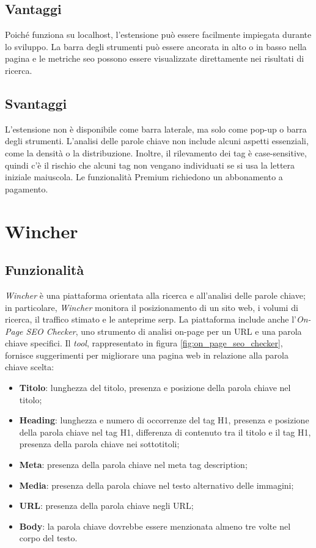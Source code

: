 \subsection{Vantaggi}
\par Poiché funziona su \gls{localhost}, l'estensione può essere facilmente impiegata durante lo sviluppo. La barra degli strumenti può essere ancorata in alto o in basso nella pagina e le metriche \gls{seo} possono essere visualizzate direttamente nei risultati di ricerca.

\subsection{Svantaggi}
\par L'estensione non è disponibile come barra laterale, ma solo come pop-up o barra degli strumenti. L'analisi delle parole chiave non include alcuni aspetti essenziali, come la densità o la distribuzione. Inoltre, il rilevamento dei tag è \gls{case-sensitive}, quindi c'è il rischio che alcuni tag non vengano individuati se si usa la lettera iniziale maiuscola. Le funzionalità Premium richiedono un abbonamento a pagamento. 

\section{Wincher}

\subsection{Funzionalità}
\par \textit{Wincher} è una piattaforma orientata alla ricerca e all'analisi delle parole chiave; in particolare, \textit{Wincher} monitora il posizionamento di un sito web, i volumi di ricerca, il traffico stimato e le anteprime \gls{serp}. La piattaforma include anche l'\textit{On-Page SEO Checker}, uno strumento di analisi \gls{on-page} per un URL e una parola chiave specifici. Il \textit{tool}, rappresentato in figura \ref{fig:on_page_seo_checker}, fornisce suggerimenti per migliorare una pagina web in relazione alla parola chiave scelta:
\begin{itemize}
    \item \textbf{Titolo}: lunghezza del titolo, presenza e posizione della parola chiave nel titolo;
    \item \textbf{Heading}: lunghezza e numero di occorrenze del tag H1, presenza e posizione della parola chiave nel tag H1, differenza di contenuto tra il titolo e il tag H1, presenza della parola chiave nei sottotitoli;
    \item \textbf{Meta}: presenza della parola chiave nel meta tag description;
    \item \textbf{Media}: presenza della parola chiave nel testo alternativo delle immagini;
    \item \textbf{URL}: presenza della parola chiave negli URL;
    \item \textbf{Body}: la parola chiave dovrebbe essere menzionata almeno tre volte nel corpo del testo.
\end{itemize}

